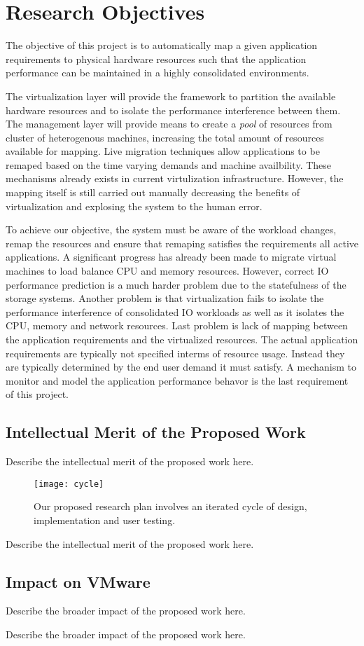 \section{Research Objectives}
\label{objectives}
%
The objective of this project is to automatically map a given application requirements to physical hardware resources such that the application performance can be maintained in a highly consolidated environments. 

The virtualization layer will provide the framework to partition the available hardware resources and to isolate the performance interference between them\cite{}. 
The management layer will provide means to create a \emph{pool} of resources from cluster of heterogenous machines\cite{}, increasing the total amount of resources available for mapping. 
Live migration techniques\cite{} allow applications to be remaped based on the time varying demands and machine availbility. 
These mechanisms already exists in current virtulization infrastructure.
However, the mapping itself is still carried out manually decreasing the benefits of virtualization and explosing the system to the human error. 

To achieve our objective, the system must be aware of the workload changes, remap the resources and ensure that remaping satisfies the requirements all active applications.
A significant progress has already been made to migrate virtual machines to load balance CPU and memory resources\cite{}.
However, correct IO performance prediction is a much harder problem due to the statefulness of the storage systems\cite{}.
Another problem is that virtualization fails to isolate the performance interference of consolidated IO workloads as well as it isolates the CPU, memory and network resources. 
Last problem is lack of mapping between the application requirements and the virtualized resources. 
The actual application requirements are typically not specified interms of resource usage. 
Instead they are typically determined by the end user demand it must satisfy.   
A mechanism to monitor and model the application performance behavor is the last requirement of this project. 


\subsection{Intellectual Merit of the Proposed Work}
%
Describe the intellectual merit of the proposed work here.

\begin{figure}[h]
\centerline{\mbox{\texttt{[image: cycle]}}}
\caption{Our proposed research plan involves an iterated 
         cycle of design, implementation and user testing.}
\label{fig:cycle}
\end{figure}

Describe the intellectual merit of the proposed work here.

\subsection{Impact on VMware}
%
Describe the broader impact of the proposed work here.

Describe the broader impact of the proposed work here.
